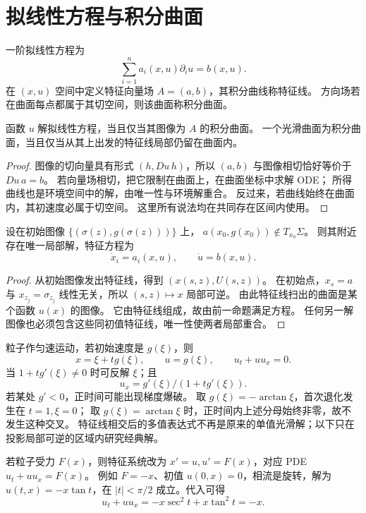 \section{拟线性方程与积分曲面}
\begin{definition}
一阶拟线性方程为
\[
 \sum_{i=1}^n a_i(x,u)\partial_i u=b(x,u).
\]
在 $(x,u)$ 空间中定义特征向量场 $A=(a,b)$，其积分曲线称特征线。
方向场若在曲面每点都属于其切空间，则该曲面称积分曲面。
\end{definition}
\begin{proposition}
函数 $u$ 解拟线性方程，当且仅当其图像为 $A$ 的积分曲面。
一个光滑曲面为积分曲面，当且仅当从其上出发的特征线局部仍留在曲面内。
\end{proposition}
\begin{proof}
图像的切向量具有形式 $(h,Du\,h)$，所以 $(a,b)$ 与图像相切恰好等价于
$Du\,a=b$。
若向量场相切，把它限制在曲面上，在曲面坐标中求解 ODE；
所得曲线也是环境空间中的解，由唯一性与环境解重合。
反过来，若曲线始终在曲面内，其初速度必属于切空间。
这里所有说法均在共同存在区间内使用。
\end{proof}

\begin{theorem}
设在初始图像 $\{(\sigma(z),g(\sigma(z)))\}$ 上，
$a(x_0,g(x_0))\notin T_{x_0}\Sigma$。
则其附近存在唯一局部解，特征方程为
\[
 \dot x_i=a_i(x,u),\qquad \dot u=b(x,u).
\]
\end{theorem}
\begin{proof}
从初始图像发出特征线，得到 $(x(s,z),U(s,z))$。
在初始点，$x_s=a$ 与 $x_{z_j}=\sigma_{z_j}$ 线性无关，所以 $(s,z)\mapsto x$ 局部可逆。
由此特征线扫出的曲面是某个函数 $u(x)$ 的图像。
它由特征线组成，故由前一命题满足方程。
任何另一解图像也必须包含这些同初值特征线，唯一性使两者局部重合。
\end{proof}

\begin{example}[无相互作用介质与光滑解失效]
粒子作匀速运动，若初始速度是 $g(\xi)$，则
\[
 x=\xi+t g(\xi),\qquad u=g(\xi),\qquad u_t+uu_x=0.
\]
当 $1+tg'(\xi)\ne0$ 时可反解 $\xi$；且
\[
 u_x=g'(\xi)/(1+tg'(\xi)).
\]
若某处 $g'<0$，正时间可能出现梯度爆破。
取 $g(\xi)=-\arctan\xi$，首次退化发生在 $t=1,\xi=0$；
取 $g(\xi)=\arctan\xi$ 时，正时间内上述分母始终非零，故不发生这种交叉。
特征线相交后的多值表达式不再是原来的单值光滑解；以下只在投影局部可逆的区域内研究经典解。
\end{example}
若粒子受力 $F(x)$，则特征系统改为 $x'=u,u'=F(x)$，对应 PDE
$u_t+uu_x=F(x)$。
例如 $F=-x$、初值 $u(0,x)=0$，相流是旋转，解为
$u(t,x)=-x\tan t$，在 $|t|<\pi/2$ 成立。代入可得
\[
 u_t+uu_x=-x\sec^2t+x\tan^2t=-x.
\]


